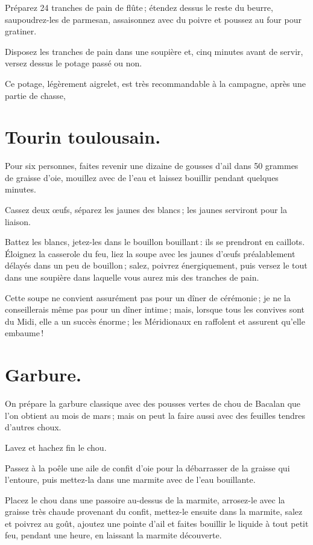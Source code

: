 Préparez 24 tranches de pain de flûte ; étendez dessus le reste du beurre,
saupoudrez-les de parmesan, assaisonnez avec du poivre et poussez au four pour
gratiner.

Disposez les tranches de pain dans une soupière et, cinq minutes avant de
servir, versez dessus le potage passé ou non.

Ce potage, légèrement aigrelet, est très recommandable à la campagne, après
une partie de chasse,

\section*{\centering Tourin toulousain.}

Pour six personnes, faites revenir une dizaine de gousses d'ail dans 50 grammes
de graisse d'oie, mouillez avec de l'eau et laissez bouillir pendant quelques
minutes.

Cassez deux œufs, séparez les jaunes des blancs ; les jaunes serviront pour la
liaison.

Battez les blancs, jetez-les dans le bouillon bouillant : ils se prendront en
caillots. Éloignez la casserole du feu, liez la soupe avec les jaunes d'œufs
préalablement délayés dans un peu de bouillon ; salez, poivrez énergiquement,
puis versez le tout dans une soupière dans laquelle vous aurez mis des tranches
de pain.

Cette soupe ne convient assurément pas pour un dîner de cérémonie ; je ne la
conseillerais même pas pour un dîner intime ; mais, lorsque tous les convives
sont du Midi, elle a un succès énorme ; les Méridionaux en raffolent et
assurent qu'elle embaume !

\section*{\centering Garbure.}

On prépare la garbure classique avec des pousses vertes de chou de Bacalan que
l'on obtient au mois de mars ; mais on peut la faire aussi avec des feuilles
tendres d'autres choux.

Lavez et hachez fin le chou.

Passez à la poêle une aile de confit d'oie pour la débarrasser de la graisse
qui l'entoure, puis mettez-la dans une marmite avec de l’eau bouillante.

Placez le chou dans une passoire au-dessus de la marmite, arrosez-le avec la
graisse très chaude provenant du confit, mettez-le ensuite dans la marmite,
salez et poivrez au goût, ajoutez une pointe d'ail et faites bouillir le
liquide à tout petit feu, pendant une heure, en laissant la marmite découverte.

